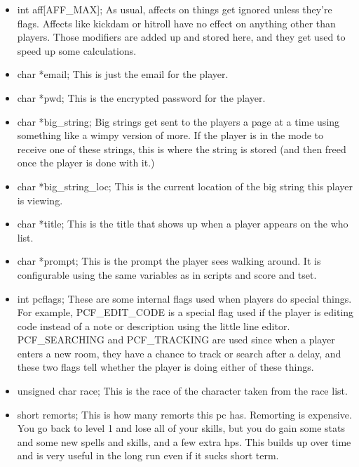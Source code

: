 \begin{itemize}
\item  int aff[AFF\_MAX];         As usual, affects on things get
  ignored unless they're flags. Affects like kickdam or hitroll have
  no effect on anything other than players. Those modifiers are added
  up and stored here, and they get used to speed up some calculations.

\item  char *email;           This is just the email for the player.

\item  char *pwd;                  This is the encrypted password for
  the player.

\item  char *big\_string;           Big strings get sent to the
players a page at a time using something like a wimpy version of
  more. If the player is in the mode to receive one of these strings,
  this is where the string is stored (and then freed once the player
  is done with it.)

\item  char *big\_string\_loc;        This is the current location of
  the big string this player is viewing.


\item  char *title;                 This is the title that shows up
when a player appears on the who list.


\item  char *prompt;             This is the prompt the player sees walking
  around. It is configurable using the same variables as in scripts
  and score and tset.

\item  int pcflags;             These are some internal flags used
  when players do special things. For example, PCF\_EDIT\_CODE is a
  special flag used if the player is editing code instead of a note or
  description using the little line editor. PCF\_SEARCHING and
  PCF\_TRACKING are used since when a player enters a new room, they
  have a chance to track or search after a delay, and these two flags
  tell whether the player is doing either of these things.

\item  unsigned char race;           This is the race of the character
  taken from the race list.


\item  short remorts;          This is how many remorts this pc
has. Remorting is expensive. You go back to level 1 and lose all of
your skills, but you do gain some stats and some new spells and
skills, and a few extra hps. This builds up over time and is very
useful in the long run even if it sucks short term.



\end{itemize}
